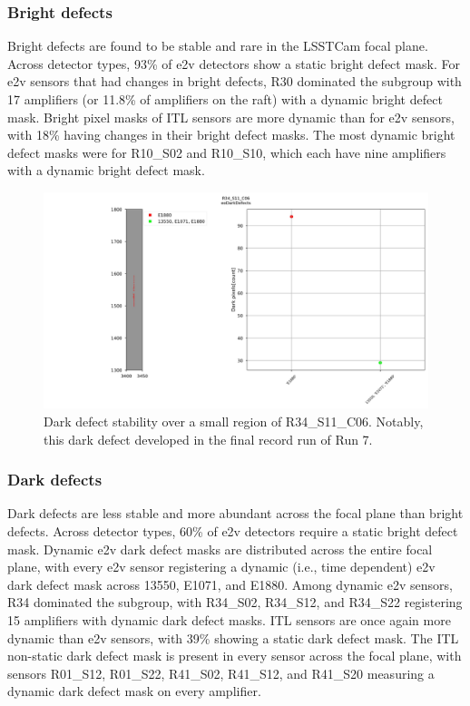 \subsubsection{Bright defects}

Bright defects are found to be stable and rare in the LSSTCam focal plane. Across detector types, 93\% of e2v detectors show a static bright defect mask. For e2v sensors that had changes in bright defects, R30 dominated the subgroup with 17 amplifiers (or 11.8\% of amplifiers on the raft) with a dynamic bright defect mask. Bright pixel masks of ITL sensors are more dynamic than for e2v sensors, with 18\% having changes in their bright defect masks. The most dynamic bright defect masks were for R10\_S02 and R10\_S10, which each have nine amplifiers with a dynamic bright defect mask.


\begin{figure}[ht]
    \centering
    \includegraphics[width=\linewidth]{figures/R34_S11_C06(2).jpg}
    \caption{Dark defect stability over a small region of R34\_S11\_C06. Notably, this dark defect developed in the final record run of Run 7.}
    \label{fig:DarkDefectStability}
\end{figure}

\subsubsection{Dark defects}

Dark defects are less stable and more abundant across the focal plane than bright defects. Across detector types, 60\% of e2v detectors require a static bright defect mask. Dynamic e2v dark defect masks are distributed across the entire focal plane, with every e2v sensor registering a dynamic (i.e., time dependent) e2v dark defect mask across 13550, E1071, and E1880. Among dynamic e2v sensors, R34 dominated the subgroup, with R34\_S02, R34\_S12, and R34\_S22 registering 15 amplifiers with dynamic dark defect masks. ITL sensors are once again more dynamic than e2v sensors, with 39\% showing a static dark defect mask. The ITL non-static dark defect mask is present in every sensor across the focal plane, with sensors R01\_S12, R01\_S22, R41\_S02, R41\_S12, and R41\_S20 measuring a dynamic dark defect mask on every amplifier.


